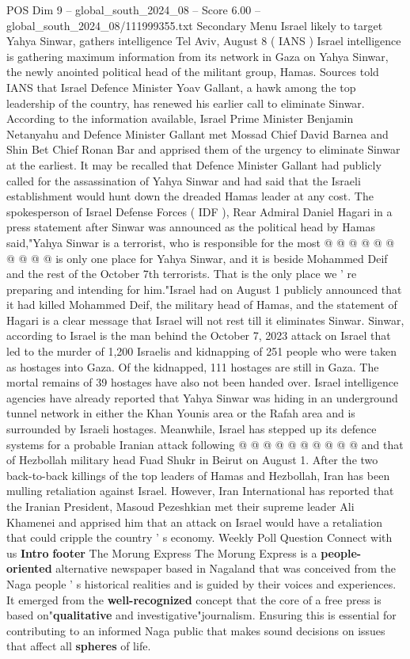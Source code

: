 \begin{textsample}{POS Dim 9 – global\_south\_2024\_08 – Score 6.00 – global\_south\_2024\_08/111999355.txt}  \label{ex:f9_pos_112}
Secondary Menu Israel likely to target Yahya Sinwar, gathers intelligence Tel Aviv, August 8 ( IANS ) Israel intelligence is gathering maximum information from its network in Gaza on Yahya Sinwar, the newly anointed political head of the militant group, Hamas.
Sources told IANS that Israel Defence Minister Yoav Gallant, a hawk among the top leadership of the country, has renewed his earlier call to eliminate Sinwar.
According to the information available, Israel Prime Minister Benjamin Netanyahu and Defence Minister Gallant met Mossad Chief David Barnea and Shin Bet Chief Ronan Bar and apprised them of the urgency to eliminate Sinwar at the earliest.
It may be recalled that Defence Minister Gallant had publicly called for the assassination of Yahya Sinwar and had said that the Israeli establishment would hunt down the dreaded Hamas leader at any cost.
The spokesperson of Israel Defense Forces ( IDF ), Rear Admiral Daniel Hagari in a press statement after Sinwar was announced as the political head by Hamas said,"Yahya Sinwar is a terrorist, who is responsible for the most @ @ @ @ @ @ @ @ @ @ is only one place for Yahya Sinwar, and it is beside Mohammed Deif and the rest of the October 7th terrorists.
That is the only place we ' re preparing and intending for him."Israel had on August 1 publicly announced that it had killed Mohammed Deif, the military head of Hamas, and the statement of Hagari is a clear message that Israel will not rest till it eliminates Sinwar.
Sinwar, according to Israel is the man behind the October 7, 2023 attack on Israel that led to the murder of 1,200 Israelis and kidnapping of 251 people who were taken as hostages into Gaza.
Of the kidnapped, 111 hostages are still in Gaza.
The mortal remains of 39 hostages have also not been handed over.
Israel intelligence agencies have already reported that Yahya Sinwar was hiding in an underground tunnel network in either the Khan Younis area or the Rafah area and is surrounded by Israeli hostages.
Meanwhile, Israel has stepped up its defence systems for a probable Iranian attack following @ @ @ @ @ @ @ @ @ @ and that of Hezbollah military head Fuad Shukr in Beirut on August 1.
After the two back-to-back killings of the top leaders of Hamas and Hezbollah, Iran has been mulling retaliation against Israel.
However, Iran International has reported that the Iranian President, Masoud Pezeshkian met their supreme leader Ali Khamenei and apprised him that an attack on Israel would have a retaliation that could cripple the country ' s economy.
Weekly Poll Question Connect with us \textbf{Intro} \textbf{footer} The Morung Express The Morung Express is a \textbf{people-oriented} alternative newspaper based in Nagaland that was conceived from the Naga people ' s historical realities and is guided by their voices and experiences.
It emerged from the \textbf{well-recognized} concept that the core of a free press is based on"\textbf{qualitative} and investigative"journalism.
Ensuring this is essential for contributing to an informed Naga public that makes sound decisions on issues that affect all \textbf{spheres} of life.

\end{textsample}
